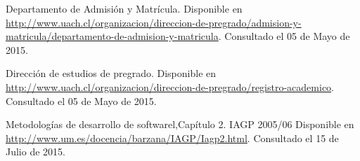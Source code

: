 \begin{spacing}{1.0}
\begin{thebibliography}{99}
\newblock Departamento de Admisión y Matrícula.
\newblock Disponible en \url{http://www.uach.cl/organizacion/direccion-de-pregrado/admision-y-matricula/departamento-de-admision-y-matricula}.
\newblock Consultado el 05 de Mayo de 2015.


\newblock Dirección de estudios de pregrado.
\newblock Disponible en \url{http://www.uach.cl/organizacion/direccion-de-pregrado/registro-academico}.
\newblock Consultado el 05 de Mayo de 2015.


\newblock Metodologías de desarrollo de softwarel,Capítulo 2. IAGP 2005/06
\newblock Disponible en \url{http://www.um.es/docencia/barzana/IAGP/Iagp2.html}.
\newblock Consultado el 15 de Julio de 2015.


\end{thebibliography}	
\end{spacing}